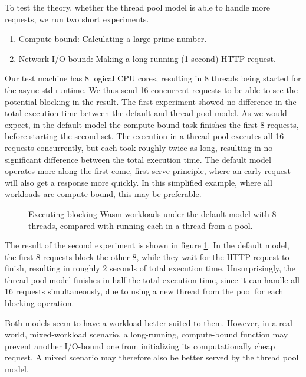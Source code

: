 To test the theory, whether the thread pool model is able to handle more requests, we run two short experiments.

\begin{enumerate}
    \item Compute-bound: Calculating a large prime number.
    \item Network-I/O-bound: Making a long-running (1 second) HTTP request.
\end{enumerate}

Our test machine has 8 logical CPU cores, resulting in 8 threads being started for the async-std runtime. We thus send 16 concurrent requests to be able to see the potential blocking in the result. The first experiment showed no difference in the total execution time between the default and thread pool model. As we would expect, in the default model the compute-bound task finishes the first 8 requests, before starting the second set. The execution in a thread pool executes all 16 requests concurrently, but each took roughly twice as long, resulting in no significant difference between the total execution time. The default model operates more along the first-come, first-serve principle, where an early request will also get a response more quickly. In this simplified example, where all workloads are compute-bound, this may be preferable.

\begin{figure}
    \begin{center}
        
    \end{center}
    \caption{Executing blocking Wasm workloads under the  default model with 8 threads, compared with running each in a thread from a pool.}
    \label{fig:default_vs_thread_pool}
\end{figure}

The result of the second experiment is shown in figure \ref{fig:default_vs_thread_pool}. In the default model, the first 8 requests block the other 8, while they wait for the HTTP request to finish, resulting in roughly 2 seconds of total execution time. Unsurprisingly, the thread pool model finishes in half the total execution time, since it can handle all 16 requests simultaneously, due to using a new thread from the pool for each blocking operation.

Both models seem to have a workload better suited to them. However, in a real-world, mixed-workload scenario, a long-running, compute-bound function may prevent another I/O-bound one from initializing its computationally cheap request. A mixed scenario may therefore also be better served by the thread pool model.

